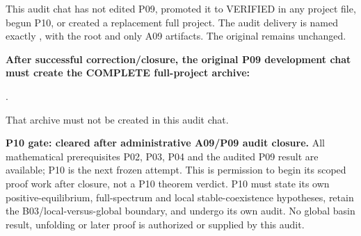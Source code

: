 \documentclass[11pt]{article}
\begin{document}
This audit chat has not edited P09, promoted it to VERIFIED in any project
file, begun P10, or created a replacement full project. The audit delivery
is named exactly , with
the root  and only A09 artifacts. The
original  remains unchanged.

\textbf{After successful correction/closure, the original P09 development
chat must create the COMPLETE full-project archive:}
\begin{center}
.
\end{center}
That archive must not be created in this audit chat.

\textbf{P10 gate: cleared after administrative A09/P09 audit closure.}
All mathematical prerequisites P02, P03, P04 and the audited P09 result
are available; P10 is the next frozen attempt. This is permission to begin
its scoped proof work after closure, not a P10 theorem verdict. P10 must
state its own positive-equilibrium, full-spectrum and local stable-coexistence
hypotheses, retain the B03/local-versus-global boundary, and undergo its own
audit. No global basin result, unfolding or later proof is authorized or
supplied by this audit.
\end{document}
